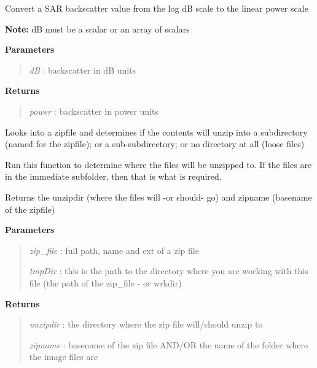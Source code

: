 \documentclass[letterpaper,10pt,openany,oneside]{sphinxmanual}
\begin{document}

\begin{fulllineitems}
\label{code:Util.getPowerScale}
Convert a SAR backscatter value from the log dB scale to the linear power scale

\textbf{Note:} dB must be a scalar or an array of scalars

\textbf{Parameters}
\begin{quote}

\emph{dB}    : backscatter in dB units
\end{quote}

\textbf{Returns}
\begin{quote}

\emph{power} : backscatter in power units
\end{quote}

\end{fulllineitems}


\begin{fulllineitems}
\label{code:Util.getZipRoot}
Looks into a zipfile and determines if the contents will unzip into a subdirectory
(named for the zipfile); or a sub-subdirectory; or no directory at all (loose files)

Run this function to determine where the files will be unzipped to. If the files are in
the immediate subfolder, then that is what is required.

Returns the unzipdir (where the files will -or should- go) and zipname (basename of the zipfile)

\textbf{Parameters}
\begin{quote}

\emph{zip\_file} : full path, name and ext of a zip file

\emph{tmpDir}   : this is the path to the directory where you are working with this file (the path of the zip\_file - or wrkdir)
\end{quote}

\textbf{Returns}
\begin{quote}

\emph{unzipdir} : the directory where the zip file will/should unzip to

\emph{zipname}  : basename of the zip file AND/OR the name of the folder where the image files are
\end{quote}

\end{fulllineitems}
\end{document}
